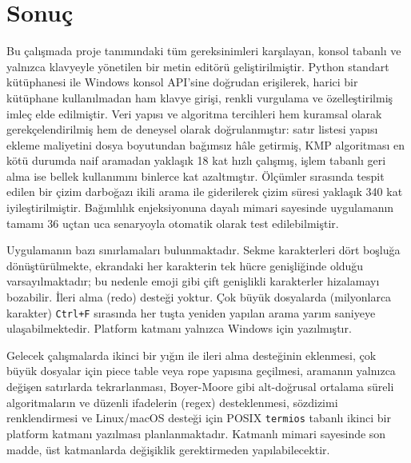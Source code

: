 \documentclass[conference,a4paper]{IEEEtran}
\newcommand{\kod}[1]{\texttt{#1}}
\begin{document}
\section{Sonuç}\label{sec:sonuc}

Bu çalışmada proje tanımındaki tüm gereksinimleri karşılayan, konsol tabanlı ve yalnızca klavyeyle yönetilen bir metin editörü geliştirilmiştir. Python standart kütüphanesi ile Windows konsol API'sine doğrudan erişilerek, harici bir kütüphane kullanılmadan ham klavye girişi, renkli vurgulama ve özelleştirilmiş imleç elde edilmiştir. Veri yapısı ve algoritma tercihleri hem kuramsal olarak gerekçelendirilmiş hem de deneysel olarak doğrulanmıştır: satır listesi yapısı ekleme maliyetini dosya boyutundan bağımsız hâle getirmiş, KMP algoritması en kötü durumda naif aramadan yaklaşık 18 kat hızlı çalışmış, işlem tabanlı geri alma ise bellek kullanımını binlerce kat azaltmıştır. Ölçümler sırasında tespit edilen bir çizim darboğazı ikili arama ile giderilerek çizim süresi yaklaşık 340 kat iyileştirilmiştir. Bağımlılık enjeksiyonuna dayalı mimari sayesinde uygulamanın tamamı 36 uçtan uca senaryoyla otomatik olarak test edilebilmiştir.

Uygulamanın bazı sınırlamaları bulunmaktadır. Sekme karakterleri dört boşluğa dönüştürülmekte, ekrandaki her karakterin tek hücre genişliğinde olduğu varsayılmaktadır; bu nedenle emoji gibi çift genişlikli karakterler hizalamayı bozabilir. İleri alma (redo) desteği yoktur. Çok büyük dosyalarda (milyonlarca karakter) \kod{Ctrl+F} sırasında her tuşta yeniden yapılan arama yarım saniyeye ulaşabilmektedir. Platform katmanı yalnızca Windows için yazılmıştır.

Gelecek çalışmalarda ikinci bir yığın ile ileri alma desteğinin eklenmesi, çok büyük dosyalar için piece table veya rope yapısına geçilmesi, aramanın yalnızca değişen satırlarda tekrarlanması, Boyer-Moore gibi alt-doğrusal ortalama süreli algoritmaların ve düzenli ifadelerin (regex) desteklenmesi, sözdizimi renklendirmesi ve Linux/macOS desteği için POSIX \kod{termios} tabanlı ikinci bir platform katmanı yazılması planlanmaktadır. Katmanlı mimari sayesinde son madde, üst katmanlarda değişiklik gerektirmeden yapılabilecektir.
\end{document}
